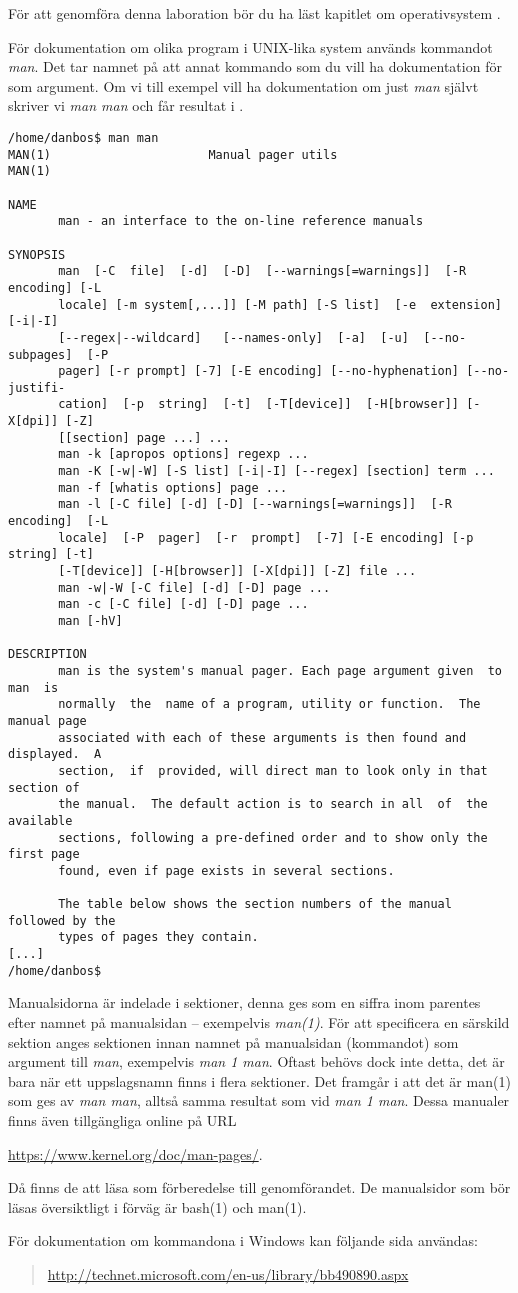 För att genomföra denna laboration bör du ha läst kapitlet om operativsystem 
\citep[kapitel 3]{Brookshear2012csa}.

För dokumentation om olika program i UNIX-lika system används kommandot 
\emph{man}.
Det tar namnet på att annat kommando som du vill ha dokumentation för som 
argument.
Om vi till exempel vill ha dokumentation om just \emph{man} självt skriver vi 
\emph{man man} och får resultat i .
\begin{lstlisting}[float=tbp,caption={Resultatet av kommandoraden \emph{man 
	man}.},label={lst:manman}]
/home/danbos$ man man
MAN(1)						Manual pager utils						MAN(1)

NAME
	   man - an interface to the on-line reference manuals

SYNOPSIS
	   man  [-C  file]  [-d]  [-D]  [--warnings[=warnings]]  [-R encoding] [-L
	   locale] [-m system[,...]] [-M path] [-S list]  [-e  extension]  [-i|-I]
	   [--regex|--wildcard]   [--names-only]  [-a]  [-u]  [--no-subpages]  [-P
	   pager] [-r prompt] [-7] [-E encoding] [--no-hyphenation] [--no-justifi-
	   cation]  [-p  string]  [-t]  [-T[device]]  [-H[browser]] [-X[dpi]] [-Z]
	   [[section] page ...] ...
	   man -k [apropos options] regexp ...
	   man -K [-w|-W] [-S list] [-i|-I] [--regex] [section] term ...
	   man -f [whatis options] page ...
	   man -l [-C file] [-d] [-D] [--warnings[=warnings]]  [-R  encoding]  [-L
	   locale]  [-P  pager]  [-r  prompt]  [-7] [-E encoding] [-p string] [-t]
	   [-T[device]] [-H[browser]] [-X[dpi]] [-Z] file ...
	   man -w|-W [-C file] [-d] [-D] page ...
	   man -c [-C file] [-d] [-D] page ...
	   man [-hV]

DESCRIPTION
	   man is the system's manual pager. Each page argument given  to  man  is
	   normally  the  name of a program, utility or function.  The manual page
	   associated with each of these arguments is then found and displayed.  A
	   section,  if  provided, will direct man to look only in that section of
	   the manual.  The default action is to search in all  of  the  available
	   sections, following a pre-defined order and to show only the first page
	   found, even if page exists in several sections.

	   The table below shows the section numbers of the manual followed by the
	   types of pages they contain.
[...]
/home/danbos$
\end{lstlisting}
Manualsidorna är indelade i sektioner, denna ges som en siffra inom parentes 
efter namnet på manualsidan -- exempelvis \emph{man(1)}.
För att specificera en särskild sektion anges sektionen innan namnet på 
manualsidan (kommandot) som argument till \emph{man}, exempelvis \emph{man 
1 man}.
Oftast behövs dock inte detta, det är bara när ett uppslagsnamn finns i flera 
sektioner.
Det framgår i  att det är man(1) som ges av \emph{man 
man}, alltså samma resultat som vid \emph{man 1 man}.
Dessa manualer finns även tillgängliga online på URL
\begin{center}
	\url{https://www.kernel.org/doc/man-pages/}.
\end{center}
Då finns de att läsa som förberedelse till genomförandet.
De manualsidor som bör läsas översiktligt i förväg är bash(1) och man(1).

För dokumentation om kommandona i Windows kan följande sida användas:
\begin{quote}
	\url{http://technet.microsoft.com/en-us/library/bb490890.aspx}
\end{quote}

